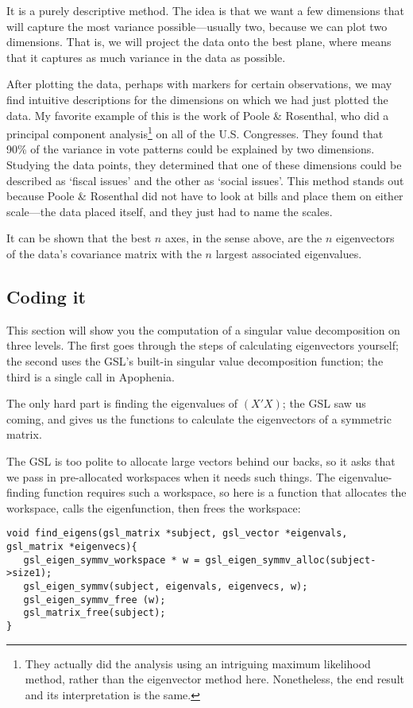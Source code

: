 It is a purely descriptive method.  The idea is that we want a few
dimensions that will capture the most variance possible---usually two,
because we can plot two dimensions. That is, we will project the data
onto the best plane, where  means that it captures as much
variance in the data as possible.

After plotting the data, perhaps with markers for certain observations,
we may find intuitive descriptions for the dimensions on which we had just plotted the
data. My favorite example of this is the work of Poole \& Rosenthal,
who did a principal component analysis\footnote{They actually did
the analysis using an intriguing maximum likelihood method, rather
than the eigenvector method here. Nonetheless, the end result and its
interpretation is the same.} on all of the U.S. Congresses. They found
that 90\% of the variance in vote patterns could be explained by two dimensions.
Studying the data points, they determined that one of these dimensions could be
described as `fiscal issues' and the other as `social issues'. This method stands
out because Poole \& Rosenthal did not have to look at bills and place them on
either scale---the data placed itself, and they just had to name the scales.


It can be shown that the best $n$ axes, in the sense above, are the
$n$ eigenvectors of the data's covariance matrix with the $n$ largest
associated eigenvalues.

\subsection{Coding it}
This section will show you the computation of a singular value
decomposition on three levels. The first goes through the steps of
calculating eigenvectors yourself; the second uses the 
GSL's built-in singular value decomposition function; the third is a
single call in Apophenia.

The only hard part is finding the eigenvalues of
$(X'X)$; the GSL saw us coming, and gives us the  functions
to calculate the eigenvectors of a symmetric matrix.

The GSL is too polite to allocate large vectors behind our backs, so
it asks that we pass in pre-allocated workspaces when it needs such
things. The eigenvalue-finding function requires such a workspace, so
here is a function that allocates the workspace, calls the eigenfunction,
then frees the workspace:
\begin{lstlisting}
void find_eigens(gsl_matrix *subject, gsl_vector *eigenvals, gsl_matrix *eigenvecs){
   gsl_eigen_symmv_workspace * w = gsl_eigen_symmv_alloc(subject->size1);
   gsl_eigen_symmv(subject, eigenvals, eigenvecs, w);
   gsl_eigen_symmv_free (w);
   gsl_matrix_free(subject);
}
\end{lstlisting}

